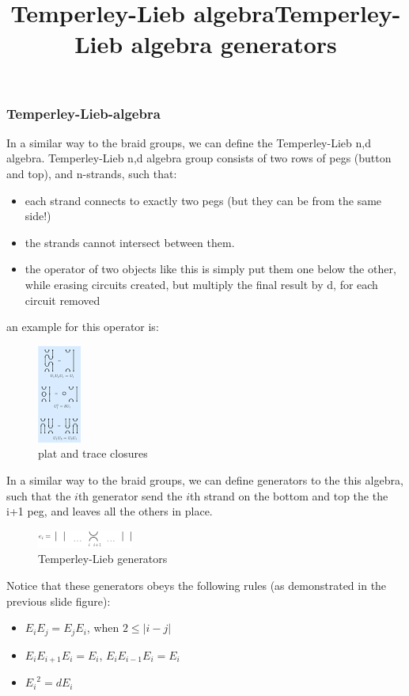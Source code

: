 \documentclass{article}
\begin{document}
\subsubsection{Temperley-Lieb-algebra}
\title{Temperley-Lieb algebra}
In a similar way to the braid groups, we can define the Temperley-Lieb {n,d} algebra.
Temperley-Lieb {n,d} algebra group consists of two rows of pegs (button and top), and n-strands, such that:
\begin{itemize}
\item each strand connects to exactly two pegs (but they can be from the same side!)
\item the strands cannot intersect between them.
\item the operator of two objects like this is simply put them one below the other, 
while erasing circuits created, but multiply the final result by d, for each circuit removed
\end{itemize}
an example for this operator is:
\begin{figure}
\includegraphics[scale=0.5]{tempely_lieb_operator} 
\caption{plat and trace closures}
\end{figure}


\title{Temperley-Lieb algebra generators}
In a similar way to the braid groups, we can define generators to the this algebra, 
such that the $i$th generator send the $i$th strand on the bottom and top the the i+1 peg, 
and leaves all the others in place.
\begin{figure}
\includegraphics[scale=0.5]{tempely_lieb_generators} 
\caption{Temperley-Lieb generators}


\end{figure}
Notice that these generators obeys the following rules (as demonstrated in the previous slide figure):
\begin{itemize}
\item $E_{i}E_{j} = E_{j}E_{i}$, when $2 \leq |i-j|$
\item $E_{i}E_{i+1}E_{i} = E_{i}$, $E_{i}E_{i-1}E_{i} = E_{i}$
\item ${E_{i}}^2 = dE_{i}$
\end{itemize}
\end{document}
